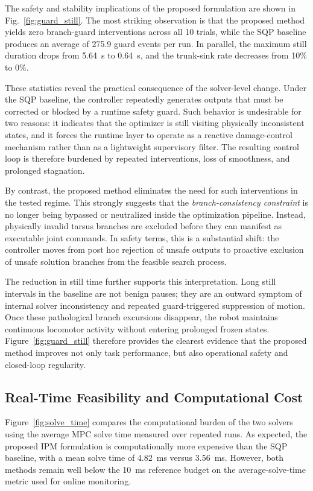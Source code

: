 The safety and stability implications of the proposed formulation are shown in Fig.~\ref{fig:guard_still}. The most striking observation is that the proposed method yields zero branch-guard interventions across all 10 trials, while the SQP baseline produces an average of 275.9 guard events per run. In parallel, the maximum still duration drops from 5.64~s to 0.64~s, and the trunk-sink rate decreases from 10\% to 0\%.

These statistics reveal the practical consequence of the solver-level change. Under the SQP baseline, the controller repeatedly generates outputs that must be corrected or blocked by a runtime safety guard. Such behavior is undesirable for two reasons: it indicates that the optimizer is still visiting physically inconsistent states, and it forces the runtime layer to operate as a reactive damage-control mechanism rather than as a lightweight supervisory filter. The resulting control loop is therefore burdened by repeated interventions, loss of smoothness, and prolonged stagnation.

By contrast, the proposed method eliminates the need for such interventions in the tested regime. This strongly suggests that the \emph{branch-consistency constraint} is no longer being bypassed or neutralized inside the optimization pipeline. Instead, physically invalid tarsus branches are excluded before they can manifest as executable joint commands. In safety terms, this is a substantial shift: the controller moves from post hoc rejection of unsafe outputs to proactive exclusion of unsafe solution branches from the feasible search process.

The reduction in still time further supports this interpretation. Long still intervals in the baseline are not benign pauses; they are an outward symptom of internal solver inconsistency and repeated guard-triggered suppression of motion. Once these pathological branch excursions disappear, the robot maintains continuous locomotor activity without entering prolonged frozen states. Figure~\ref{fig:guard_still} therefore provides the clearest evidence that the proposed method improves not only task performance, but also operational safety and closed-loop regularity.

\subsection{Real-Time Feasibility and Computational Cost}

Figure~\ref{fig:solve_time} compares the computational burden of the two solvers using the average MPC solve time measured over repeated runs. As expected, the proposed IPM formulation is computationally more expensive than the SQP baseline, with a mean solve time of 4.82~ms versus 3.56~ms. However, both methods remain well below the 10~ms reference budget on the average-solve-time metric used for online monitoring.

